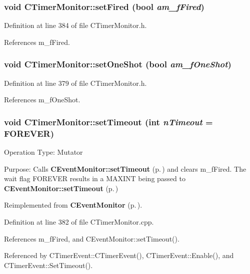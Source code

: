 \subsubsection{\setlength{\rightskip}{0pt plus 5cm}void CTimer\-Monitor::set\-Fired (bool {\em am\_\-f\-Fired})\hspace{0.3cm}{\tt  [inline, protected]}}\label{classCTimerMonitor_b1}




Definition at line 384 of file CTimer\-Monitor.h.

References m\_\-f\-Fired.
\subsubsection{\setlength{\rightskip}{0pt plus 5cm}void CTimer\-Monitor::set\-One\-Shot (bool {\em am\_\-f\-One\-Shot})\hspace{0.3cm}{\tt  [inline, protected]}}\label{classCTimerMonitor_b0}




Definition at line 379 of file CTimer\-Monitor.h.

References m\_\-f\-One\-Shot.
\subsubsection{\setlength{\rightskip}{0pt plus 5cm}void CTimer\-Monitor::set\-Timeout (int {\em n\-Timeout} = {\bf FOREVER})\hspace{0.3cm}{\tt  [virtual]}}\label{classCTimerMonitor_a9}


Operation Type: Mutator

Purpose: Calls {\bf CEvent\-Monitor::set\-Timeout} {\rm (p.\,\pageref{classCEventMonitor_b0})} and clears m\_\-f\-Fired. The wait flag FOREVER results in a MAXINT being passed to {\bf CEvent\-Monitor::set\-Timeout} {\rm (p.\,\pageref{classCEventMonitor_b0})} 

Reimplemented from {\bf CEvent\-Monitor} {\rm (p.\,\pageref{classCEventMonitor_a8})}.

Definition at line 382 of file CTimer\-Monitor.cpp.

References m\_\-f\-Fired, and CEvent\-Monitor::set\-Timeout().

Referenced by CTimer\-Event::CTimer\-Event(), CTimer\-Event::Enable(), and CTimer\-Event::Set\-Timeout().

